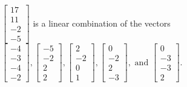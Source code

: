 \begin{exercise}
\begin{exerciseStatement}
  \end{exerciseStatement}
  \begin{exerciseAnswer}
   \(\left[\begin{array}{c}
17 \\
11 \\
-2 \\
-5
\end{array}\right]\) 
  	 is  
	a linear combination of the vectors \(\left[\begin{array}{c}
-4 \\
-3 \\
-4 \\
-2
\end{array}\right] , \left[\begin{array}{c}
-5 \\
-2 \\
2 \\
2
\end{array}\right] , \left[\begin{array}{c}
2 \\
-2 \\
0 \\
1
\end{array}\right] , \left[\begin{array}{c}
0 \\
-2 \\
2 \\
-3
\end{array}\right] , \text{ and } \left[\begin{array}{c}
0 \\
-3 \\
-3 \\
2
\end{array}\right]\).

	
  


  \end{exerciseAnswer}
\end{exercise}